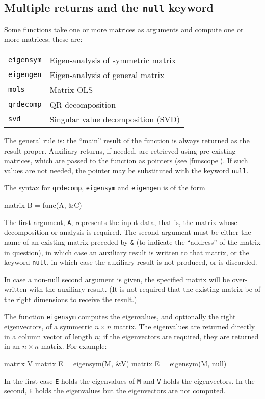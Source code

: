 \subsection{Multiple returns and the \texttt{null} keyword}
\label{matrix-multiples}

Some functions take one or more matrices as arguments and compute one
or more matrices; these are:

\begin{center}
\begin{tabular}{ll}
\texttt{eigensym} & Eigen-analysis of symmetric matrix \\
\texttt{eigengen} & Eigen-analysis of general matrix \\
\texttt{mols}     & Matrix OLS \\
\texttt{qrdecomp} & QR decomposition \\
\texttt{svd}      & Singular value decomposition (SVD) 
\end{tabular}
\end{center}

The general rule is: the ``main'' result of the function is always
returned as the result proper. Auxiliary returns, if needed, are
retrieved using pre-existing matrices, which are passed to the
function as pointers (see \ref{funscope}). If such values are not
needed, the pointer may be substituted with the keyword \texttt{null}.

The syntax for \texttt{qrdecomp}, \texttt{eigensym} and
\texttt{eigengen} is of the form
%
\begin{code}
matrix B = func(A, &C)
\end{code}
%
The first argument, \texttt{A}, represents the input data, that is,
the matrix whose decomposition or analysis is required.  The second
argument must be either the name of an existing matrix preceded by
\verb+&+ (to indicate the ``address'' of the matrix in question), in
which case an auxiliary result is written to that matrix, or the
keyword \texttt{null}, in which case the auxiliary result is not
produced, or is discarded.

In case a non-null second argument is given, the specified matrix will
be over-written with the auxiliary result.  (It is not required that
the existing matrix be of the right dimensions to receive the result.)

The function \texttt{eigensym} computes the eigenvalues, and
optionally the right eigenvectors, of a symmetric $n \times n$ matrix.
The eigenvalues are returned directly in a column vector of length
$n$; if the eigenvectors are required, they are returned in an $n
\times n$ matrix.  For example:
%
\begin{code}
matrix V
matrix E = eigensym(M, &V)
matrix E = eigensym(M, null)
\end{code}
%
In the first case \texttt{E} holds the eigenvalues of \texttt{M} and
\texttt{V} holds the eigenvectors.  In the second, \texttt{E} holds
the eigenvalues but the eigenvectors are not computed.

